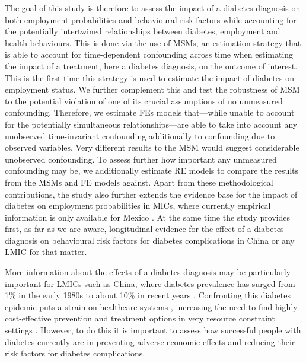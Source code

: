 The goal of this study is therefore to assess the impact of a diabetes diagnosis on both employment probabilities and behavioural risk factors while accounting for the potentially intertwined relationships between diabetes, employment and health behaviours. This is done via the use of \acp{MSM}, an estimation strategy that is able to account for time-dependent confounding across time \parencite{Robins2000} when estimating the impact of a treatment, here a diabetes diagnosis, on the outcome of interest. This is the first time this strategy is used to estimate the impact of diabetes on employment status. We further complement this and test the robustness of \ac{MSM} to the potential violation of one of its crucial assumptions of no unmeasured confounding. Therefore, we estimate \acp{FE} models that---while unable to account for the potentially simultaneous relationships---are able to take into account any unobserved time-invariant confounding additionally to confounding due to observed variables. Very different results to the \ac{MSM} would suggest considerable unobserved confounding. To assess further how important any unmeasured confounding may be, we additionally estimate \ac{RE} models to compare the results from the \acp{MSM} and \ac{FE} models against. Apart from these methodological contributions, the study also further extends the evidence base for the impact of diabetes on employment probabilities in \acp{MIC}, where currently empirical information is only available for Mexico \parencite{Seuring2016}. At the same time the study provides first, as far as we are aware, longitudinal evidence for the effect of a diabetes diagnosis on behavioural risk factors for diabetes complications in China or any \ac{LMIC} for that matter.

 
More information about the effects of a diabetes diagnosis may be particularly important for \acp{LMIC} such as China, where diabetes prevalence has surged from 1\% in the early 1980s to about 10\% in recent years \autocite{Hu2011,Risk2016}. Confronting this diabetes epidemic puts a strain on healthcare systems \parencite{Seuring2015a}, increasing the need to find highly cost-effective prevention and treatment options in very resource constraint settings \parencite{WHOresearchpriorities2010}. However, to do this it is important to assess how successful people with diabetes currently are in preventing adverse economic effects and reducing their risk factors for diabetes complications.

